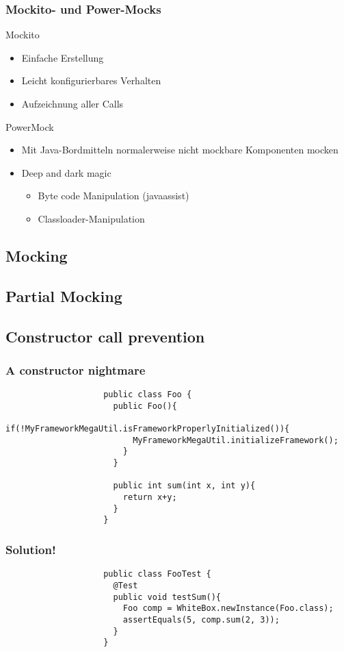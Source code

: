 \documentclass{beamer}
\begin{document}
			\begin{frame}
				\frametitle{Mockito- und Power-Mocks}
				Mockito
				\begin{itemize}
					\item{Einfache Erstellung}
					\item{Leicht konfigurierbares Verhalten}
					\item{Aufzeichnung aller Calls}
				\end{itemize}
				\pause
				PowerMock
				\begin{itemize}
					\item{Mit Java-Bordmitteln normalerweise nicht mockbare Komponenten mocken}
					\item{Deep and dark magic}
						\begin{itemize}
							\item{Byte code Manipulation (javaassist)}
							\item{Classloader-Manipulation}
						\end{itemize}
				\end{itemize}
			\end{frame}

		\subsection{Mocking}
		\subsection{Partial Mocking}
		\subsection{Constructor call prevention}
			\begin{frame}[fragile]
				\frametitle{A constructor nightmare}

				\begin{lstlisting}
					public class Foo {
					  public Foo(){
					    if(!MyFrameworkMegaUtil.isFrameworkProperlyInitialized()){
					      MyFrameworkMegaUtil.initializeFramework();	
					    }
					  }

					  public int sum(int x, int y){
					    return x+y;
					  }
					}
				\end{lstlisting}

			\end{frame}

			\begin{frame}[fragile]
				\frametitle{Solution!}

				\begin{lstlisting}
					public class FooTest {
					  @Test
					  public void testSum(){
					    Foo comp = WhiteBox.newInstance(Foo.class);
					    assertEquals(5, comp.sum(2, 3));
					  }
					}
				\end{lstlisting}

			\end{frame}
\end{document}
